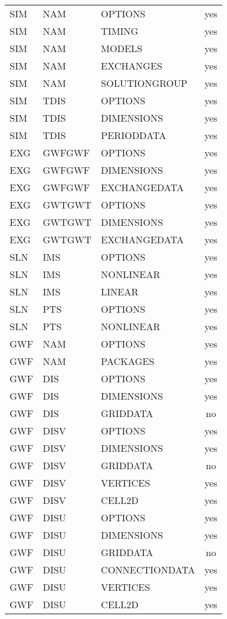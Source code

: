 \begin{longtable}{p{1.5cm} p{1.5cm} p{3cm} c}
\hline
SIM & NAM & OPTIONS & yes \\ 
SIM & NAM & TIMING & yes \\ 
SIM & NAM & MODELS & yes \\ 
SIM & NAM & EXCHANGES & yes \\ 
SIM & NAM & SOLUTIONGROUP & yes \\ 
\hline
SIM & TDIS & OPTIONS & yes \\ 
SIM & TDIS & DIMENSIONS & yes \\ 
SIM & TDIS & PERIODDATA & yes \\ 
\hline
EXG & GWFGWF & OPTIONS & yes \\ 
EXG & GWFGWF & DIMENSIONS & yes \\ 
EXG & GWFGWF & EXCHANGEDATA & yes \\ 
\hline
EXG & GWTGWT & OPTIONS & yes \\ 
EXG & GWTGWT & DIMENSIONS & yes \\ 
EXG & GWTGWT & EXCHANGEDATA & yes \\ 
\hline
SLN & IMS & OPTIONS & yes \\ 
SLN & IMS & NONLINEAR & yes \\ 
SLN & IMS & LINEAR & yes \\ 
\hline
SLN & PTS & OPTIONS & yes \\ 
SLN & PTS & NONLINEAR & yes \\ 
\hline
GWF & NAM & OPTIONS & yes \\ 
GWF & NAM & PACKAGES & yes \\ 
\hline
GWF & DIS & OPTIONS & yes \\ 
GWF & DIS & DIMENSIONS & yes \\ 
GWF & DIS & GRIDDATA & no \\ 
\hline
GWF & DISV & OPTIONS & yes \\ 
GWF & DISV & DIMENSIONS & yes \\ 
GWF & DISV & GRIDDATA & no \\ 
GWF & DISV & VERTICES & yes \\ 
GWF & DISV & CELL2D & yes \\ 
\hline
GWF & DISU & OPTIONS & yes \\ 
GWF & DISU & DIMENSIONS & yes \\ 
GWF & DISU & GRIDDATA & no \\ 
GWF & DISU & CONNECTIONDATA & yes \\ 
GWF & DISU & VERTICES & yes \\ 
GWF & DISU & CELL2D & yes \\ 

\end{longtable}
